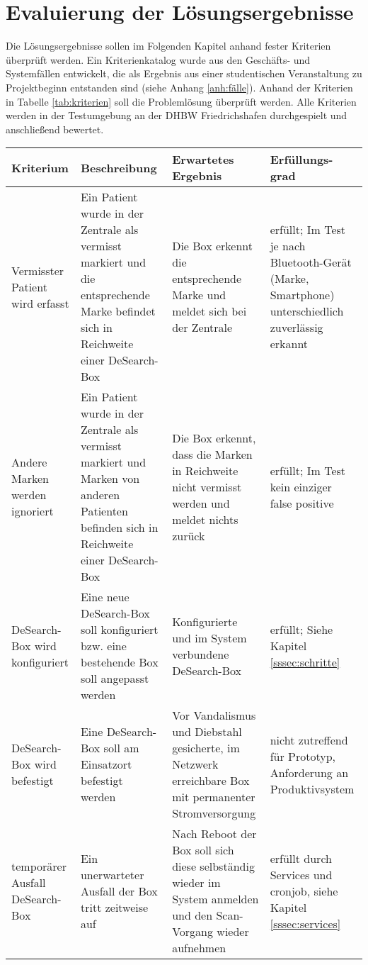 \section{Evaluierung der Lösungsergebnisse}\label{sec:evaluierung}
Die Lösungsergebnisse sollen im Folgenden Kapitel anhand fester Kriterien überprüft werden. Ein Kriterienkatalog wurde aus den Geschäfts- und Systemfällen entwickelt, die als Ergebnis aus einer studentischen Veranstaltung zu Projektbeginn entstanden sind (siehe Anhang \ref{anh:fälle}).
Anhand der Kriterien in Tabelle \ref{tab:kriterien} soll die Problemlösung überprüft werden. Alle Kriterien werden in der Testumgebung an der DHBW Friedrichshafen durchgespielt und anschließend bewertet.
\begin{center}
	\begin{longtable}{ | p{} | p{5cm} | p{5cm} | p{} |}
	 \hline
	 \textbf{Kriterium} & \textbf{Beschreibung} & \textbf{Erwartetes Ergebnis} & \textbf{Erfüllungs-grad} \\ \hline
	 Vermisster Patient wird erfasst & Ein Patient wurde in der Zentrale als vermisst markiert und die entsprechende Marke befindet sich in Reichweite einer DeSearch-Box & Die Box erkennt die entsprechende Marke und meldet sich bei der Zentrale & erfüllt; Im Test je nach Bluetooth-Gerät (Marke, Smartphone) unterschiedlich zuverlässig erkannt \\ \hline
	 Andere Marken werden ignoriert & Ein Patient wurde in der Zentrale als vermisst markiert und Marken von anderen Patienten befinden sich in Reichweite einer DeSearch-Box & Die Box erkennt, dass die Marken in Reichweite nicht vermisst werden und meldet nichts zurück & erfüllt; Im Test kein einziger false positive \\ 
	 \hline
	 DeSearch-Box wird konfiguriert & Eine neue DeSearch-Box soll konfiguriert bzw. eine bestehende Box soll angepasst werden & Konfigurierte und im System verbundene DeSearch-Box & erfüllt; Siehe Kapitel \ref{sssec:schritte} \\ 
	 \hline
	 DeSearch-Box wird befestigt & Eine DeSearch-Box soll am Einsatzort befestigt werden & Vor Vandalismus und Diebstahl gesicherte, im Netzwerk erreichbare Box mit permanenter Stromversorgung & nicht zutreffend für Prototyp, Anforderung an Produktivsystem \\ 
	 \hline
	 temporärer Ausfall DeSearch-Box & Ein unerwarteter Ausfall der Box tritt zeitweise auf & Nach Reboot der Box soll sich diese selbständig wieder im System anmelden und den Scan-Vorgang wieder aufnehmen & erfüllt durch Services und cronjob, siehe Kapitel \ref{sssec:services}\\ 

\end{longtable}
\end{center}
